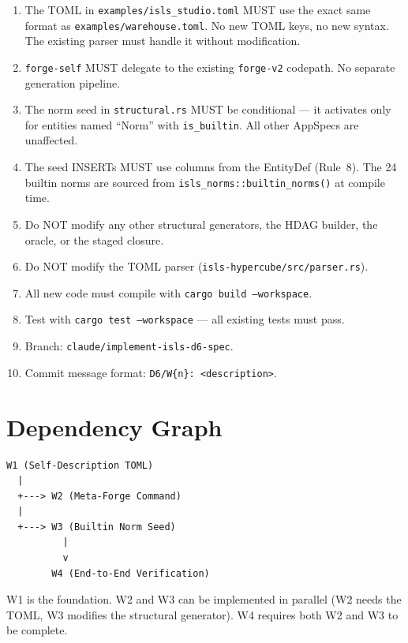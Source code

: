 \documentclass[11pt,a4paper]{article}
\begin{document}
\begin{enumerate}
\item The TOML in \texttt{examples/isls\_studio.toml} MUST use the
      exact same format as \texttt{examples/warehouse.toml}. No new
      TOML keys, no new syntax. The existing parser must handle it
      without modification.
\item \texttt{forge-self} MUST delegate to the existing \texttt{forge-v2}
      codepath. No separate generation pipeline.
\item The norm seed in \texttt{structural.rs} MUST be conditional ---
      it activates only for entities named ``Norm'' with
      \texttt{is\_builtin}. All other AppSpecs are unaffected.
\item The seed INSERTs MUST use columns from the EntityDef (Rule~8).
      The 24 builtin norms are sourced from
      \texttt{isls\_norms::builtin\_norms()} at compile time.
\item Do NOT modify any other structural generators, the HDAG builder,
      the oracle, or the staged closure.
\item Do NOT modify the TOML parser
      (\texttt{isls-hypercube/src/parser.rs}).
\item All new code must compile with \texttt{cargo build --workspace}.
\item Test with \texttt{cargo test --workspace} --- all existing
      tests must pass.
\item Branch: \texttt{claude/implement-isls-d6-spec}.
\item Commit message format: \texttt{D6/W\{n\}: <description>}.
\end{enumerate}


\section{Dependency Graph}

\begin{verbatim}
W1 (Self-Description TOML)
  |
  +---> W2 (Meta-Forge Command)
  |
  +---> W3 (Builtin Norm Seed)
          |
          v
        W4 (End-to-End Verification)
\end{verbatim}

W1 is the foundation. W2 and W3 can be implemented in parallel
(W2 needs the TOML, W3 modifies the structural generator). W4
requires both W2 and W3 to be complete.
\end{document}
